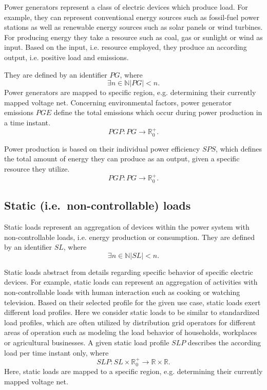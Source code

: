 Power generators represent a class of electric devices which produce load. For example, they can represent conventional energy sources such as fossil-fuel power stations as well as renewable energy sources such as solar panels or wind turbines. For producing energy they take a resource such as coal, gas or sunlight or wind as input. Based on the input, i.e. resource employed, they produce an according output, i.e. positive load and emissions. 

They are defined by an identifier $PG$, where 
\[
\exists n \in \mathbb{N} |PG| < n \mathrm{.}
\]
Power generators are mapped to specific region, e.g. determining their currently mapped voltage net.
Concerning environmental factors, power generator emissions $PGE$ define the total emissions which occur during power production in a time instant.
\[
PGP : PG \rightarrow \mathbb{R}_0^+ \mathrm{.}
\]

Power production is based on their individual power efficiency $SPS$, which defines the total amount of energy they can produce as an output, given a specific resource they utilize.
\[	
PGP : PG \rightarrow \mathbb{R}_0^+ \mathrm{.}
\]
%	
%	



\subsection{Static (i.e.\ non-controllable) loads}
\label{static_loads}
Static loads represent an aggregation of devices within the power system with non-controllable loads, i.e. energy production or consumption. 
They are defined by an identifier $SL$, where 
\[
\exists n \in \mathbb{N} |SL| < n \mathrm{.}
\]

Static loads abstract from details regarding specific behavior of specific electric devices.
For example, static loads can represent an aggregation of activities with non-controllable loads with human interaction such as cooking or watching television. Based on their selected profile for the given use case, static loads exert different load profiles. Here we consider static loads to be similar to standardized load profiles, which are often utilized by distribution grid operators for different areas of operation such as modeling the load behavior of households, workplaces or agricultural businesses.
A given static load profile $SLP$ describes the according load per time instant only, where
\[
SLP : SL \times \mathbb{R}_0^+ \rightarrow \mathbb{R} \times \mathbb{R} \mathrm{.}
\]
Here, static loads are mapped to a specific region, e.g. determining their currently mapped voltage net.

